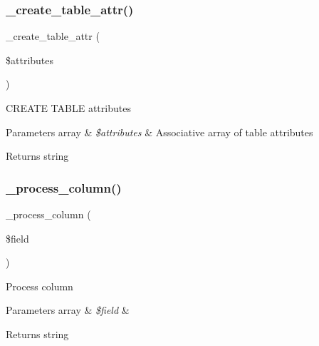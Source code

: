 \subsubsection{\texorpdfstring{\+\_\+create\+\_\+table\+\_\+attr()}{\_create\_table\_attr()}}
{\footnotesize\ttfamily \+\_\+create\+\_\+table\+\_\+attr (\begin{DoxyParamCaption}\item[{}]{\$attributes }\end{DoxyParamCaption})\hspace{0.3cm}{\ttfamily [protected]}}

C\+R\+E\+A\+TE T\+A\+B\+LE attributes


\begin{DoxyParams}[1]{Parameters}
array & {\em \$attributes} & Associative array of table attributes \\
\hline
\end{DoxyParams}
\begin{DoxyReturn}{Returns}
string 
\end{DoxyReturn}
\mbox{\label{class_c_i___d_b__mysql__forge_a8f38f1c5b5dddecca4befbe393f3f299}} 
\subsubsection{\texorpdfstring{\+\_\+process\+\_\+column()}{\_process\_column()}}
{\footnotesize\ttfamily \+\_\+process\+\_\+column (\begin{DoxyParamCaption}\item[{}]{\$field }\end{DoxyParamCaption})\hspace{0.3cm}{\ttfamily [protected]}}

Process column


\begin{DoxyParams}[1]{Parameters}
array & {\em \$field} & \\
\hline
\end{DoxyParams}
\begin{DoxyReturn}{Returns}
string 
\end{DoxyReturn}
\mbox{\label{class_c_i___d_b__mysql__forge_ae0bdb4ea3418590d1894c5b621b5ca50}} 
